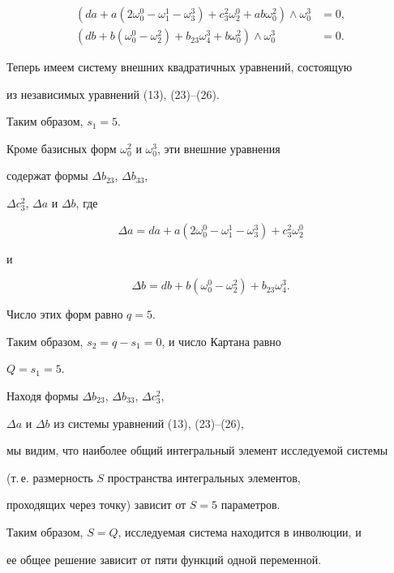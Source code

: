 \begin{pf}
\begin{align}
(da + a (2  \omega_0^0 - \omega_1^1 - \omega_3^3) + c_3^2 


\omega_2^0 + ab \omega_0^2)  \wedge \omega_0^3 &= 0, \\


%


\label{eq:31}


(db + b (\omega_0^0 - \omega_2^2)+ b_{23} \omega_4^3 + b


\omega_0^2) \wedge \omega_0^3 &= 0.


\end{align}


Теперь имеем систему внешних квадратичных уравнений, состоящую


из независимых уравнений (13), (23)--(26).


Таким образом, $s_1 = 5$.


Кроме базисных форм $\omega_0^2$ и $\omega_0^3$, эти внешние уравнения


содержат формы $\Delta b_{23}$, $\Delta b_{33}$,


$\Delta c_{3}^2$, $\Delta a$ и $\Delta b$, где


\begin{equation}\label{eq:32}


\Delta a = da + a (2  \omega_0^0 - \omega_1^1 - \omega_3^3) +


c_3^2 \omega_2^0


\end{equation}


и


$$


\Delta b = db + b (\omega_0^0 - \omega_2^2)+ b_{23} \omega_4^3.


$$


Число этих форм равно $q = 5$.


Таким образом, $s_2 = q - s_1 = 0$, и число Картана равно


$Q = s_1 = 5$.


Находя формы  $\Delta b_{23}$, $\Delta b_{33}$, $\Delta c_{3}^2$,


$\Delta a$ и $\Delta b$ из системы уравнений (13), (23)--(26),


мы видим, что наиболее общий интегральный элемент исследуемой системы


(т.\,е. размерность $S$ пространства интегральных элементов,


проходящих через точку) зависит от $S = 5$ параметров.


Таким образом,  $S = Q$, исследуемая система находится в инволюции, и


ее общее решение зависит от пяти функций одной переменной.


\end{pf}





